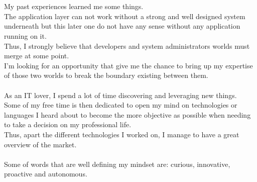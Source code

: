 \paragraphstyle
\\\\
My past experiences learned me some things.\\
The application layer can not work without a strong and well designed system underneath but this later one do not have any sense without any application running on it.\\
Thus, I strongly believe that developers and system administrators worlds must merge at some point.\\
I’m looking for an opportunity that give me the chance to bring up my expertise of those two worlds to break the boundary existing between them.\\
\\
As an IT lover, I spend a lot of time discovering and leveraging new things. \\
Some of my free time is then dedicated to open my mind on technologies or languages I heard about to become the more objective as possible when needing to take a decision on my professional life. \\
Thus, apart the different technologies I worked on, I manage to have a great overview of the market. \\
\\
Some of words that are well defining my mindset are: curious, innovative, proactive and autonomous. \\
\\